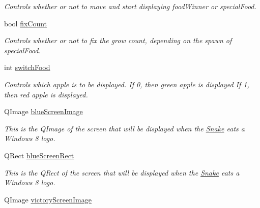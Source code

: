 \begin{DoxyCompactItemize}
\begin{DoxyCompactList}\small\item\em \-Controls whether or not to move and start displaying food\-Winner or special\-Food. \end{DoxyCompactList}\item 
\hypertarget{classGame_ab4986d9d9139d5438a086b406b4311e4}{bool \hyperlink{classGame_ab4986d9d9139d5438a086b406b4311e4}{fix\-Count}}\label{classGame_ab4986d9d9139d5438a086b406b4311e4}

\begin{DoxyCompactList}\small\item\em \-Controls whether or not to fix the grow count, depending on the spawn of special\-Food. \end{DoxyCompactList}\item 
\hypertarget{classGame_ae5a98023415893d7fb8876e6d6662466}{int \hyperlink{classGame_ae5a98023415893d7fb8876e6d6662466}{switch\-Food}}\label{classGame_ae5a98023415893d7fb8876e6d6662466}

\begin{DoxyCompactList}\small\item\em \-Controls which apple is to be displayed. \-If 0, then green apple is displayed \-If 1, then red apple is displayed. \end{DoxyCompactList}\item 
\hypertarget{classGame_a04465acd56797ce91dd05167a6a094aa}{\-Q\-Image \hyperlink{classGame_a04465acd56797ce91dd05167a6a094aa}{blue\-Screen\-Image}}\label{classGame_a04465acd56797ce91dd05167a6a094aa}

\begin{DoxyCompactList}\small\item\em \-This is the \-Q\-Image of the screen that will be displayed when the \hyperlink{classSnake}{\-Snake} eats a \-Windows 8 logo. \end{DoxyCompactList}\item 
\hypertarget{classGame_a56dc55af7346a05f0c5e63fc334a193b}{\-Q\-Rect \hyperlink{classGame_a56dc55af7346a05f0c5e63fc334a193b}{blue\-Screen\-Rect}}\label{classGame_a56dc55af7346a05f0c5e63fc334a193b}

\begin{DoxyCompactList}\small\item\em \-This is the \-Q\-Rect of the screen that will be displayed when the \hyperlink{classSnake}{\-Snake} eats a \-Windows 8 logo. \end{DoxyCompactList}\item 
\hypertarget{classGame_a64ed5ba3c707a1bc23eeca263d8707f3}{\-Q\-Image \hyperlink{classGame_a64ed5ba3c707a1bc23eeca263d8707f3}{victory\-Screen\-Image}}\label{classGame_a64ed5ba3c707a1bc23eeca263d8707f3}


\end{DoxyCompactItemize}
